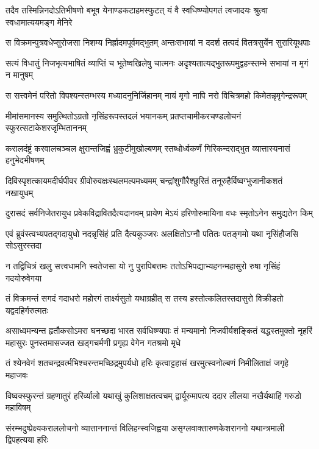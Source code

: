 \twolineshloka
{तदैव तस्मिन्निनदोऽतिभीषणो बभूव येनाण्डकटाहमस्फुटत्}
{यं वै स्वधिष्ण्योपगतं त्वजादयः श्रुत्वा स्वधामात्ययमङ्ग मेनिरे} %

\twolineshloka
{स विक्रमन्पुत्रवधेप्सुरोजसा निशम्य निर्ह्रादमपूर्वमद्भुतम्}
{अन्तःसभायां न ददर्श तत्पदं वितत्रसुर्येन सुरारियूथपाः} %

\twolineshloka
{सत्यं विधातुं निजभृत्यभाषितं व्याप्तिं च भूतेष्वखिलेषु चात्मनः}
{अदृश्यतात्यद्भुतरूपमुद्वहन्स्तम्भे सभायां न मृगं न मानुषम्} %

\twolineshloka
{स सत्त्वमेनं परितो विपश्यन्स्तम्भस्य मध्यादनुनिर्जिहानम्}
{नायं मृगो नापि नरो विचित्रमहो किमेतन्नृमृगेन्द्ररूपम्} %

\twolineshloka
{मीमांसमानस्य समुत्थितोऽग्रतो नृसिंहरूपस्तदलं भयानकम्}
{प्रतप्तचामीकरचण्डलोचनं स्फुरत्सटाकेशरजृम्भिताननम्} %

\twolineshloka
{करालदंष्ट्रं करवालचञ्चल क्षुरान्तजिह्वं भ्रुकुटीमुखोल्बणम्}
{स्तब्धोर्ध्वकर्णं गिरिकन्दराद्भुत व्यात्तास्यनासं हनुभेदभीषणम्} %

\twolineshloka
{दिविस्पृशत्कायमदीर्घपीवर ग्रीवोरुवक्षःस्थलमल्पमध्यमम्}
{चन्द्रांशुगौरैश्छुरितं तनूरुहैर्विष्वग्भुजानीकशतं नखायुधम्} %

\twolineshloka
{दुरासदं सर्वनिजेतरायुध प्रवेकविद्रावितदैत्यदानवम्}
{प्रायेण मेऽयं हरिणोरुमायिना वधः स्मृतोऽनेन समुद्यतेन किम्} %

\twolineshloka
{एवं ब्रुवंस्त्वभ्यपतद्गदायुधो नदन्नृसिंहं प्रति दैत्यकुञ्जरः}
{अलक्षितोऽग्नौ पतितः पतङ्गमो यथा नृसिंहौजसि सोऽसुरस्तदा} %

\twolineshloka
{न तद्विचित्रं खलु सत्त्वधामनि स्वतेजसा यो नु पुरापिबत्तमः}
{ततोऽभिपद्याभ्यहनन्महासुरो रुषा नृसिंहं गदयोरुवेगया} %

\twolineshloka
{तं विक्रमन्तं सगदं गदाधरो महोरगं तार्क्ष्यसुतो यथाग्रहीत्}
{स तस्य हस्तोत्कलितस्तदासुरो विक्रीडतो यद्वदहिर्गरुत्मतः} %

\threelineshloka
{असाध्वमन्यन्त हृतौकसोऽमरा घनच्छदा भारत सर्वधिष्ण्यपाः}
{तं मन्यमानो निजवीर्यशङ्कितं यद्धस्तमुक्तो नृहरिं महासुरः}
{पुनस्तमासज्जत खड्गचर्मणी प्रगृह्य वेगेन गतश्रमो मृधे} %

\twolineshloka
{तं श्येनवेगं शतचन्द्रवर्त्मभिश्चरन्तमच्छिद्रमुपर्यधो हरिः}
{कृत्वाट्टहासं खरमुत्स्वनोल्बणं निमीलिताक्षं जगृहे महाजवः} %

\twolineshloka
{विष्वक्स्फुरन्तं ग्रहणातुरं हरिर्व्यालो यथाखुं कुलिशाक्षतत्वचम्}
{द्वार्यूरुमापत्य ददार लीलया नखैर्यथाहिं गरुडो महाविषम्} %

\twolineshloka
{संरम्भदुष्प्रेक्ष्यकराललोचनो व्यात्ताननान्तं विलिहन्स्वजिह्वया}
{असृग्लवाक्तारुणकेशराननो यथान्त्रमाली द्विपहत्यया हरिः} %


